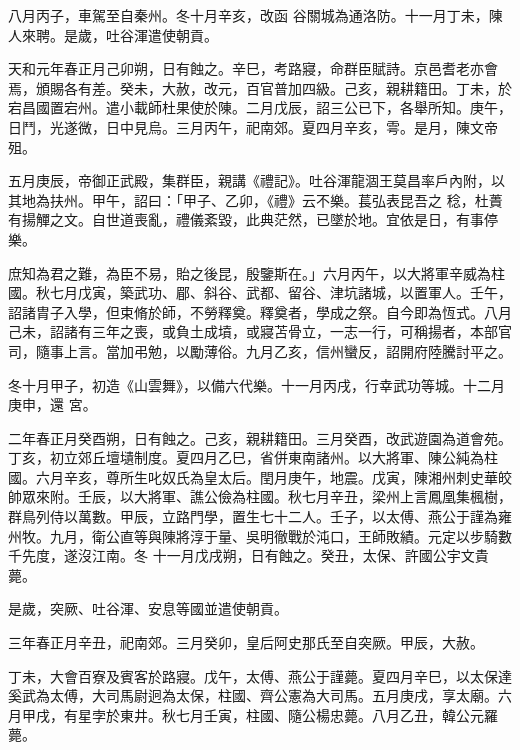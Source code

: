 \begin{pinyinscope}
 八月丙子，車駕至自秦州。冬十月辛亥，改函
 谷關城為通洛防。十一月丁未，陳人來聘。是歲，吐谷渾遣使朝貢。



 天和元年春正月己卯朔，日有蝕之。辛巳，考路寢，命群臣賦詩。京邑耆老亦會焉，頒賜各有差。癸未，大赦，改元，百官普加四級。己亥，親耕籍田。丁未，於宕昌國置宕州。遣小載師杜果使於陳。二月戊辰，詔三公已下，各舉所知。庚午，日鬥，光遂微，日中見烏。三月丙午，祀南郊。夏四月辛亥，雩。是月，陳文帝殂。



 五月庚辰，帝御正武殿，集群臣，親講《禮記》。吐谷渾龍涸王莫昌率戶內附，以其地為扶州。甲午，詔曰：「甲子、乙卯，《禮》云不樂。萇弘表昆吾之
 稔，杜蕢有揚觶之文。自世道喪亂，禮儀紊毀，此典茫然，已墜於地。宜依是日，有事停樂。



 庶知為君之難，為臣不易，貽之後昆，殷鑒斯在。」六月丙午，以大將軍辛威為柱國。秋七月戊寅，築武功、郿、斜谷、武都、留谷、津坑諸城，以置軍人。壬午，詔諸胄子入學，但束脩於師，不勞釋奠。釋奠者，學成之祭。自今即為恆式。八月己未，詔諸有三年之喪，或負土成墳，或寢苫骨立，一志一行，可稱揚者，本部官司，隨事上言。當加弔勉，以勵薄俗。九月乙亥，信州蠻反，詔開府陸騰討平之。



 冬十月甲子，初造《山雲舞》，以備六代樂。十一月丙戌，行幸武功等城。十二月庚申，還
 宮。



 二年春正月癸酉朔，日有蝕之。己亥，親耕籍田。三月癸酉，改武遊園為道會苑。丁亥，初立郊丘壇壝制度。夏四月乙巳，省併東南諸州。以大將軍、陳公純為柱國。六月辛亥，尊所生叱奴氏為皇太后。閏月庚午，地震。戊寅，陳湘州刺史華皎帥眾來附。壬辰，以大將軍、譙公儉為柱國。秋七月辛丑，梁州上言鳳凰集楓樹，群鳥列侍以萬數。甲辰，立路門學，置生七十二人。壬子，以太傅、燕公于謹為雍州牧。九月，衛公直等與陳將淳于量、吳明徹戰於沌口，王師敗績。元定以步騎數千先度，遂沒江南。冬
 十一月戊戌朔，日有蝕之。癸丑，太保、許國公宇文貴薨。



 是歲，突厥、吐谷渾、安息等國並遣使朝貢。



 三年春正月辛丑，祀南郊。三月癸卯，皇后阿史那氏至自突厥。甲辰，大赦。



 丁未，大會百寮及賓客於路寢。戊午，太傅、燕公于謹薨。夏四月辛巳，以太保達奚武為太傅，大司馬尉迥為太保，柱國、齊公憲為大司馬。五月庚戌，享太廟。六月甲戌，有星孛於東井。秋七月壬寅，柱國、隨公楊忠薨。八月乙丑，韓公元羅薨。




\end{pinyinscope}
